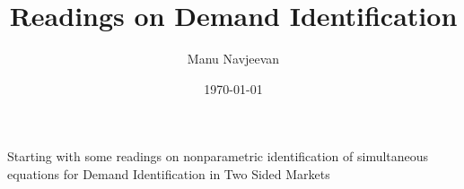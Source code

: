 \documentclass[10pt]{article}
\title{Readings on Demand Identification}
\author{Manu Navjeevan}
\date{\today}
\theoremstyle{exampstyle}
\begin{document}
\maketitle
\tableofcontents
\newpage

Starting with some readings on nonparametric identification of simultaneous equations for Demand Identification in Two Sided Markets 


\newpage

\end{document}
